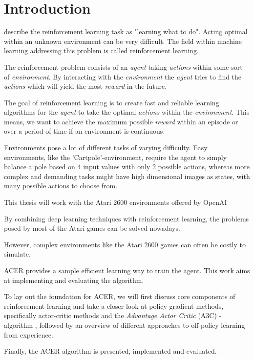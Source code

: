\section{Introduction}\raggedbottom 
\citet{Sut98} describe the reinforcement learning  task as "learning what to do".
Acting optimal within an unknown environment can be very difficult.
The field within machine learning addressing this problem is called reinforcement learning.

The reinforcement problem consists of an \textit{agent} taking \textit{actions} within some sort of \textit{environment}.
By interacting with the \textit{environment} the \textit{agent} tries to find the \textit{actions} which will yield the most \textit{reward} in the future.

The goal of reinforcement learning is to create fast and reliable learning algorithms for the \textit{agent} to take the optimal \textit{actions} within the \textit{environment}.
This means, we want to achieve the maximum possible \textit{reward} within an episode or over a period of time if an environment is continuous.

Environments pose a lot of different tasks of varying difficulty.
Easy environments, like the 'Cartpole'-environment, require the agent to simply balance a pole based on 4 input values with only 2 possible actions, whereas more complex and demanding tasks might have high dimensional images as states, with many possible actions to choose from.

This thesis will work with the Atari 2600 environments offered by OpenAI \citep{openaigym}

By combining deep learning techniques \citep{Hinton504} with reinforcement learning, the problems posed by most of the Atari games can be solved nowadays.

However, complex environments like the Atari 2600 games can often be costly to simulate.

ACER \citep{ACER} provides a sample efficient learning way to train the agent. This work aims at implementing and evaluating the algorithm.

To lay out the foundation for ACER, we will first discuss core components of reinforcement learning and take a closer look at policy gradient methods, specifically actor-critic methods and the \textit{Advantage Actor Critic} (A3C) - algorithm \citep{A3C}, followed by an overview of different approaches to off-policy learning from experience.

Finally, the ACER algorithm is presented, implemented and evaluated.


\pagebreak